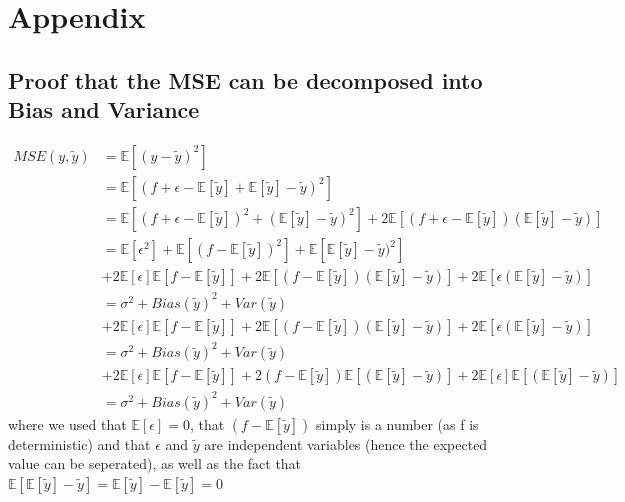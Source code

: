 \documentclass[11pt,a4paper,titlepage]{article}
\begin{document}
\section{Appendix}
\subsection{Proof that the MSE can be decomposed into Bias and Variance}
\begin{equation}\label{Proof}
\begin{split}
MSE(y,\tilde y) & =\mathbb{E}\left[({y}-{\tilde y})^2  \right] \\
&= \mathbb{E}\left[({f}+{\epsilon}-\mathbb{E}\left[\tilde y\right]+\mathbb{E}\left[\tilde y\right]-{\tilde y})^2  \right]\\
&= \mathbb{E}\left[(f+\epsilon- \mathbb{E}\left[\tilde y\right])^2+(\mathbb{E}\left[\tilde y\right]-{\tilde y})^2 \right]+2\mathbb{E}\left[(f+\epsilon-\mathbb{E}\left[\tilde y\right])(\mathbb{E}\left[\tilde y\right]-\tilde y)\right]\\
&= \mathbb{E}\left[\epsilon^2\right]+\mathbb{E}\left[(f-\mathbb{E}\left[\tilde y\right])^2\right]+\mathbb{E}\left[ \mathbb{E}\left[\tilde y\right]-\tilde y)^2\right]\\   & +2\mathbb{E}\left[\epsilon\right]\mathbb{E}\left[f-\mathbb{E}\left[\tilde y\right]\right]+2\mathbb{E}\left[(f-\mathbb{E}\left[\tilde y\right])(\mathbb{E}\left[\tilde y\right]-\tilde y)\right] +2\mathbb{E}\left[\epsilon (\mathbb{E}\left[\tilde y\right]-\tilde y)\right] \\ 
&=\sigma^2+Bias(\tilde y)^2+Var(\tilde y) \\ &
+2\mathbb{E}\left[\epsilon\right]\mathbb{E}\left[f-\mathbb{E}\left[\tilde y\right]\right]+2\mathbb{E}\left[(f-\mathbb{E}\left[\tilde y\right])(\mathbb{E}\left[\tilde y\right]-\tilde y)\right] +2\mathbb{E}\left[\epsilon (\mathbb{E}\left[\tilde y\right]-\tilde y)\right] \\
&=\sigma^2+Bias(\tilde y)^2+Var(\tilde y) \\ &
+2\mathbb{E}\left[\epsilon\right]\mathbb{E}\left[f-\mathbb{E}\left[\tilde y\right]\right]+2(f-\mathbb{E}\left[\tilde y\right])\mathbb{E}\left[(\mathbb{E}\left[\tilde y\right]-\tilde y)\right] +2\mathbb{E}\left[\epsilon\right]\mathbb{E}\left[ (\mathbb{E}\left[\tilde y\right]-\tilde y)\right]\\
&=\sigma^2+Bias(\tilde y)^2+Var(\tilde y)
\end{split}
\end{equation}
where we used that $\mathbb{E}\left[\epsilon\right]=0$, that $(f-\mathbb{E}\left[\tilde y\right])$ simply is a number (as f is deterministic) and that $\epsilon$ and $\tilde y$ are independent variables (hence the expected value can be seperated), as well as the fact that $\mathbb{E}\left[\mathbb{E}\left[\tilde y\right]-\tilde y\right]=\mathbb{E}\left[\tilde y\right]-\mathbb{E}\left[\tilde y\right]=0$ 
\end{document}
